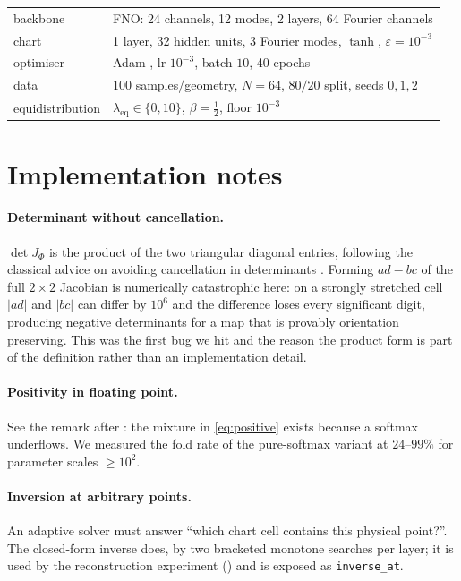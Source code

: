 \documentclass[11pt,a4paper]{article}
\theoremstyle{plain}
\theoremstyle{definition}
\newcommand{\detJ}{\det J_\Phi}
\newcommand{\code}[1]{\texttt{#1}}
\begin{document}
\begin{table}[h]
\centering
\begin{tabular}{ll}
\toprule
backbone & FNO: 24 channels, 12 modes, 2 layers, 64 Fourier channels \\
chart & 1 layer, 32 hidden units, 3 Fourier modes, $\tanh$, $\varepsilon=10^{-3}$ \\
optimiser & Adam \cite{kingma2015adam}, lr $10^{-3}$, batch $10$, 40 epochs \\
data & $100$ samples/geometry, $N=64$, $80/20$ split, seeds $0,1,2$ \\
equidistribution & $\lambda_{\mathrm{eq}}\in\{0,10\}$, $\beta=\tfrac12$, floor $10^{-3}$ \\
\bottomrule
\end{tabular}
\end{table}

\section{Implementation notes}
\label{app:impl}

\paragraph{Determinant without cancellation.}  $\detJ$ is the product of the two
triangular diagonal entries, following the classical advice on avoiding
cancellation in determinants \cite{higham2002accuracy}.  Forming $ad-bc$ of the full $2\times2$ Jacobian is
numerically catastrophic here: on a strongly stretched cell $|ad|$ and $|bc|$
can differ by $10^{6}$ and the difference loses every significant digit,
producing negative determinants for a map that is provably orientation
preserving.  This was the first bug we hit and the reason the product form is
part of the definition rather than an implementation detail.

\paragraph{Positivity in floating point.}  See the remark after
: the mixture in \eqref{eq:positive} exists because a softmax
underflows.  We measured the fold rate of the pure-softmax variant at $24$–$99\%$
for parameter scales $\ge10^{2}$.

\paragraph{Inversion at arbitrary points.}  An adaptive solver must answer
``which chart cell contains this physical point?''.  The closed-form inverse
does, by two bracketed monotone searches per layer; it is used by the
reconstruction experiment () and is exposed as
\code{inverse\_at}.
\end{document}

